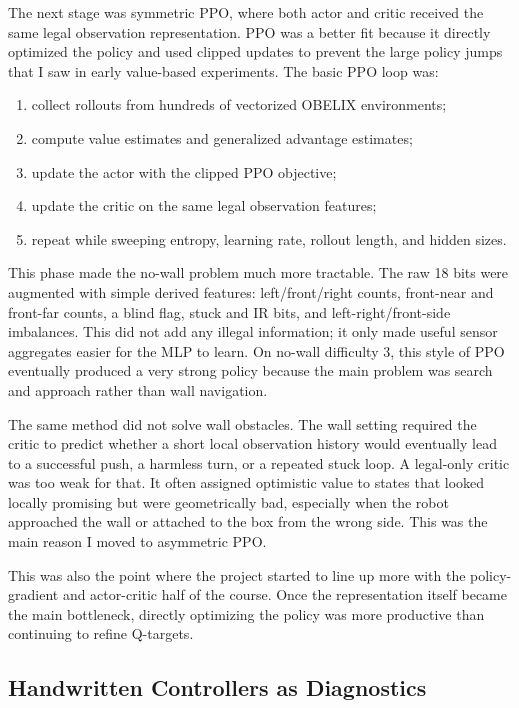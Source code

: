 \documentclass[11pt]{article}
\begin{document}
The next stage was symmetric PPO, where both actor and critic received the same legal
observation representation. PPO was a better fit because it directly optimized the
policy and used clipped updates to prevent the large policy jumps that I saw in early
value-based experiments. The basic PPO loop was:
\begin{enumerate}[leftmargin=1.5em]
  \item collect rollouts from hundreds of vectorized OBELIX environments;
  \item compute value estimates and generalized advantage estimates;
  \item update the actor with the clipped PPO objective;
  \item update the critic on the same legal observation features;
  \item repeat while sweeping entropy, learning rate, rollout length, and hidden sizes.
\end{enumerate}

This phase made the no-wall problem much more tractable. The raw 18 bits were augmented
with simple derived features: left/front/right counts, front-near and front-far counts,
a blind flag, stuck and IR bits, and left-right/front-side imbalances. This did not add
any illegal information; it only made useful sensor aggregates easier for the MLP to
learn. On no-wall difficulty 3, this style of PPO eventually produced a very strong
policy because the main problem was search and approach rather than wall navigation.

The same method did not solve wall obstacles. The wall setting required the critic to
predict whether a short local observation history would eventually lead to a successful
push, a harmless turn, or a repeated stuck loop. A legal-only critic was too weak for
that. It often assigned optimistic value to states that looked locally promising but were
geometrically bad, especially when the robot approached the wall or attached to the box
from the wrong side. This was the main reason I moved to asymmetric PPO.

This was also the point where the project started to line up more with the policy-gradient
and actor-critic half of the course. Once the representation itself became the main
bottleneck, directly optimizing the policy was more productive than continuing to refine
Q-targets.

\subsection{Handwritten Controllers as Diagnostics}
\end{document}
